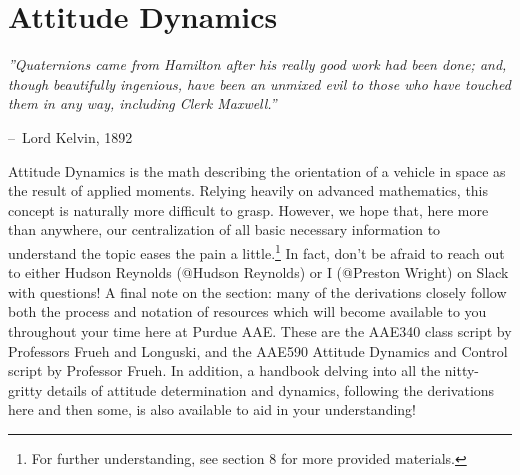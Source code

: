 \documentclass[12pt]{report}
\makeatletter
\newenvironment{chapquote}[2][2em]
  {\setlength{\@tempdima}{#1}%
   \def\chapquote@author{#2}%
   \parshape 1 \@tempdima \dimexpr\textwidth-2\@tempdima\relax%
   \itshape}
  {\par\normalfont\hfill--\ \chapquote@author\hspace*{\@tempdima}\par\bigskip}
\makeatother
\begin{document}
\chapter{Attitude Dynamics}\label{sec:attitude dynamics}
\begin{chapquote}{Lord Kelvin, 1892}
''Quaternions came from Hamilton after his really good work had been done; and, though beautifully ingenious, have been an unmixed evil to those who have touched them in any way, including Clerk Maxwell.''
\end{chapquote}
Attitude Dynamics is the math describing the orientation of a vehicle in space as the result of applied moments. Relying heavily on advanced mathematics, this concept is naturally more difficult to grasp. However, we hope that, here more than anywhere, our centralization of all basic necessary information to understand the topic eases the pain a little.\footnote{For further understanding, see section 8 for more provided materials. } In fact, don’t be afraid to reach out to either Hudson Reynolds (@Hudson Reynolds) or I (@Preston Wright) on Slack with questions! A final note on the section: many of the derivations closely follow both the process and notation of resources which will become available to you throughout your time here at Purdue AAE. These are the AAE340 class script by Professors Frueh and Longuski, and the AAE590 Attitude Dynamics and Control script by Professor Frueh. In addition, a handbook delving into all the nitty-gritty details of attitude determination and dynamics, following the derivations here and then some, is also available to aid in your understanding! %














\end{document}
